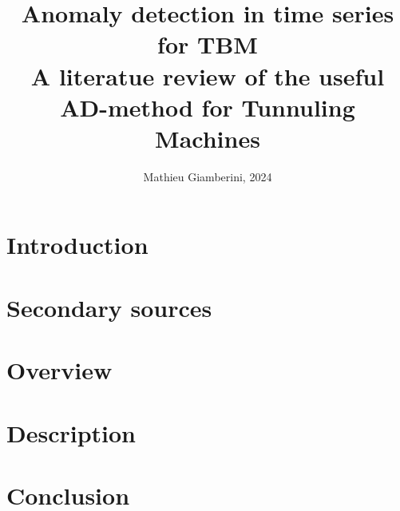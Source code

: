 \documentclass{article}
\title{Anomaly detection in time series for TBM \\ \small{A literatue review of the useful AD-method for Tunnuling Machines}}
\author{Mathieu Giamberini, 2024}
\date{}
\begin{document}
    \maketitle
    \begin{abstract}
        
    \end{abstract}
    
    \begin{multicols}{2}
        \section*{Introduction}
            
            \newpage

        \section{Secondary sources}
            

        \section{Overview}
            


        \section{Description}
            


        \section*{Conclusion}
            
    
    \end{multicols}
\end{document}
